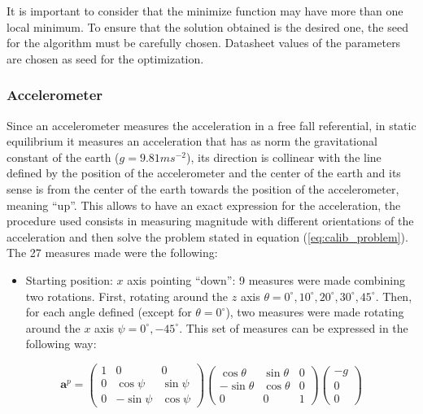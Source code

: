 \documentclass[conference]{IEEEtran}
\newcommand{\refp}[1]{(\ref{#1})}
\begin{document}
It is important to consider that the minimize function may have more than one local minimum. To ensure that the solution obtained is the desired one, the seed for the algorithm must be carefully chosen. Datasheet values of the parameters are chosen as seed for the optimization.

\subsubsection{Accelerometer}
\label{subsec:acc}
Since an accelerometer measures the acceleration in a free fall referential, in static equilibrium it measures an acceleration that has as norm the gravitational constant of the  earth ($g = 9.81ms^{-2}$), its direction is collinear with the line defined by the position of the accelerometer and the center of the earth and its sense is from the center of the earth towards the position of the accelerometer, meaning ``up''. This allows to have an exact expression for the acceleration, the procedure used consists in measuring magnitude with different orientations of the acceleration and then solve the problem stated in equation \refp{eq:calib_problem}.\\

The 27 measures made were the following:
\begin{itemize}
\item Starting position: $x$ axis pointing ``down'': 9 measures were made combining two rotations. First, rotating around the $z$ axis $\theta =0^\circ, 10^\circ, 20^\circ, 30^\circ, 45^\circ$. Then, for each angle defined (except for $\theta = 0^\circ$), two measures were made rotating around the $x$ axis $\psi = 0^\circ, -45^\circ$. This set of measures can be expressed in the following way:
\end{itemize}

\begin{scriptsize}
\begin{equation}
\mathbf{a}^p = \left(\begin{array}{ccc}
1 & 0 & 0\\
0 & \cos \psi & \sin \psi \\
0 & -\sin \psi & \cos \psi
\end{array}\right)\left(\begin{array}{ccc}
\cos \theta & \sin \theta & 0\\
-\sin \theta & \cos \theta & 0\\
0 & 0 & 1
\end{array}\right)\left(\begin{array}{c}
-g\\
0\\
0
\end{array}\right)
\label{eq:acc_x}
\end{equation}
\end{scriptsize}
\end{document}
